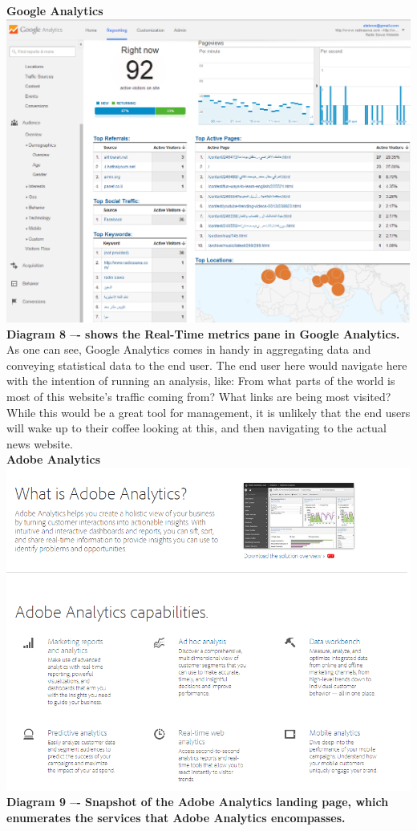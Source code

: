 \documentclass[12pt]{article}
\begin{document}
\noindent\textbf{Google Analytics} \\
\noindent\includegraphics[scale=0.45]{img/google_analytics}
\noindent\textbf{Diagram 8 –- shows the Real-Time metrics pane in Google Analytics.} \\

As one can see, Google Analytics comes in handy in aggregating data and conveying statistical data to the end user. The end user here would navigate here with the intention of running an analysis, like: From what parts of the world is most of this website’s traffic coming from? What links are being most visited?
While this would be a great tool for management, it is unlikely that the end users will wake up to their coffee looking at this, and then navigating to the actual news website. \\

\noindent\textbf{Adobe Analytics} \\
\noindent\includegraphics[scale=0.6]{img/adobe_analytics}
\noindent\textbf{Diagram 9 –- Snapshot of the Adobe Analytics landing page, which enumerates the services that Adobe Analytics encompasses.} \\
\end{document}
